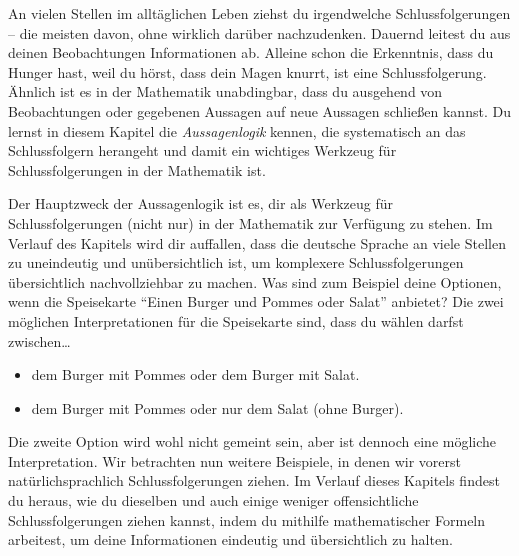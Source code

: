 \documentclass[../../main.tex]{subfiles}
\begin{document}
    An vielen Stellen im alltäglichen Leben ziehst du irgendwelche Schlussfolgerungen -- die meisten davon, ohne wirklich darüber nachzudenken. Dauernd leitest du aus deinen Beobachtungen Informationen ab. Alleine schon die Erkenntnis, dass du Hunger hast, weil du hörst, dass dein Magen knurrt, ist eine Schlussfolgerung. Ähnlich ist es in der Mathematik unabdingbar, dass du ausgehend von Beobachtungen oder gegebenen Aussagen auf neue Aussagen schließen kannst. Du lernst in diesem Kapitel die \emph{Aussagenlogik} kennen, die systematisch an das Schlussfolgern herangeht und damit ein wichtiges Werkzeug für Schlussfolgerungen in der Mathematik ist.
    
    Der Hauptzweck der Aussagenlogik ist es, dir als Werkzeug für Schlussfolgerungen (nicht nur) in der Mathematik zur Verfügung zu stehen. Im Verlauf des Kapitels wird dir auffallen, dass die deutsche Sprache an viele Stellen zu uneindeutig und unübersichtlich ist, um komplexere Schlussfolgerungen übersichtlich nachvollziehbar zu machen. Was sind zum Beispiel deine Optionen, wenn die Speisekarte \enquote{Einen Burger und Pommes oder Salat} anbietet? Die zwei möglichen Interpretationen für die Speisekarte sind, dass du wählen darfst zwischen\dots
    \begin{itemize}[label=\dots, nosep]
        \item dem Burger mit Pommes oder dem Burger mit Salat.
        \item dem Burger mit Pommes oder nur dem Salat (ohne Burger).
    \end{itemize}
    Die zweite Option wird wohl nicht gemeint sein, aber ist dennoch eine mögliche Interpretation. Wir betrachten nun weitere Beispiele, in denen wir vorerst natürlichsprachlich Schlussfolgerungen ziehen. Im Verlauf dieses Kapitels findest du heraus, wie du dieselben und auch einige weniger offensichtliche Schlussfolgerungen ziehen kannst, indem du mithilfe mathematischer Formeln arbeitest, um deine Informationen eindeutig und übersichtlich zu halten.
    
    
\end{document}
